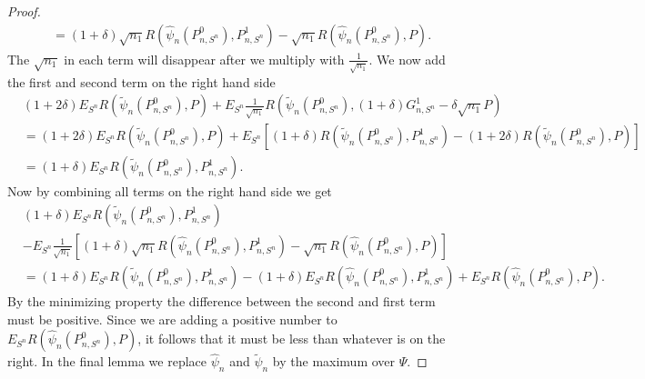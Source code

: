 \documentclass[11pt, a4paper]{article}
\theoremstyle{definition}
\theoremstyle{remark}
\newcommand{\la}{\psi}
\newcommand{\Sn}{S^n}
\newcommand{\lib}{\Psi}
\begin{document}
\begin{proof}
\begin{align*}
       &=(1 + \delta) \sqrt{n_1} R(\hat{\la}_n (P_{n, \Sn}^{0}), P_{n,\Sn}^{1}) - \sqrt{n_1}   R(\hat{\la}_n (P_{n, \Sn}^{0}), P).
  \end{align*}
  The $ \sqrt{n_1} $ in each term will disappear after we multiply with $ \frac{1}{\sqrt{n_1}} $. We now add the first and second term on the right hand side 
  \begin{align*}
      &(1 + 2 \delta) E_{\Sn} R( \tilde{\la}_n(P_{n, \Sn}^{0}) , P ) +E_{\Sn} \frac{1}{\sqrt{n_1} } R(\tilde{\la}_n (P_{n, \Sn}^{0}), (1 + \delta) G_{n,\Sn}^{1} - \delta \sqrt{n_1} P)\\ 
      &= (1 + 2 \delta) E_{\Sn} R( \tilde{\la}_n(P_{n, \Sn}^{0}) , P ) + E_{\Sn} \left[(1 + \delta) R(\tilde{\la}_n (P_{n, \Sn}^{0}), P_{n,\Sn}^{1}) - (1 + 2\delta)R(\tilde{\la}_n (P_{n, \Sn}^{0}), P) \right]\\
      &=(1 + \delta) E_{\Sn} R(\tilde{\la}_n (P_{n, \Sn}^{0}), P_{n,\Sn}^{1}).
  \end{align*}
Now by combining all terms on the right hand side we get
\begin{align*}
    &(1 + \delta) E_{\Sn} R(\tilde{\la}_n (P_{n, \Sn}^{0}), P_{n,\Sn}^{1})\\
    &-E_{\Sn} \frac{1}{\sqrt{n_1} } \left[ (1 + \delta) \sqrt{n_1} R(\hat{\la}_n (P_{n, \Sn}^{0}), P_{n,\Sn}^{1}) - \sqrt{n_1}   R(\hat{\la}_n (P_{n, \Sn}^{0}), P) \right] \\
    &= (1 + \delta) E_{\Sn} R(\tilde{\la}_n (P_{n, \Sn}^{0}), P_{n,\Sn}^{1})- (1 + \delta)E_{\Sn}R(\hat{\la}_n (P_{n, \Sn}^{0}), P_{n,\Sn}^{1})+ E_{\Sn} R(\hat{\la}_n (P_{n, \Sn}^{0}), P).
\end{align*}
By the minimizing property the difference between the second and first term must be positive. Since we are adding a positive number to $ E_{\Sn} R(\hat{\la}_n (P_{n, \Sn}^{0}), P) $, it follows that it must be less than whatever is on the right. In the final lemma we replace $ \hat{\la}_n  $ and $ \tilde{\la}_n  $ by the maximum over $ \lib $.  
  
\end{proof}
\end{document}
